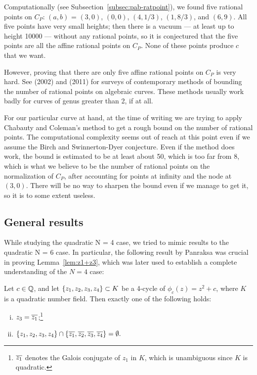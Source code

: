 Computationally (see Subsection~\ref{subsec:pab-ratpoint}), we found
five rational points on $C_P$: $(a, b)$ = $(3, 0)$, $(0, 0)$, $(4,
1/3)$, $(1, 8/3)$, and $(6, 9)$. All five points have very small
heights; then there is a vacuum --- at least up to height 10000 ---
without any rational points, so it is conjectured that the five points
are all the affine rational points on $C_P$. None of these points
produce $c$ that we want.

However, proving that there are only five affine rational points on
$C_P$ is very hard. See \cite{MR1956273} (2002) and \cite{MR2780629}
(2011) for surveys of contemporary methods of bounding the number of
rational points on algebraic curves. These methods usually work badly
for curves of genus greater than 2, if at all.

For our particular curve at hand, at the time of writing we are trying
to apply Chabauty and Coleman's method to get a rough bound on the
number of rational points. The computational complexity seems out of
reach at this point even if we assume the Birch and Swinnerton-Dyer
conjecture. Even if the method does work, the bound is estimated to be
at least about 50, which is too far from 8, which is what we believe
to be the number of rational points on the normalization of $C_P$,
after accounting for points at infinity and the node at $(3,
0)$. There will be no way to sharpen the bound even if we manage to
get it, so it is to some extent useless.

\subsection{General results}
\label{subsec:general}

While studying the quadratic N = 4 case, we tried to mimic results
to the quadratic N = 6 case. In particular, the following result by
Panraksa was crucial in proving Lemma~\ref{lem:z1+z3}, which was later
used to establish a complete understanding of the $N = 4$ case:

\begin{theorem} 
  Let $c \in \mathbb{Q}$, and let $\left\{z_1, z_2, z_3, z_4\right\} \subset K$ be a
  4-cycle of $\phi_c(z) = z^2 + c$, where $K$ is a quadratic number
  field. Then exactly one of the following holds:
  \begin{enumerate}[(i)]
  \item $z_3 = \overline{z_1}$;\footnote{%
      $\overline{z_1}$ denotes the Galois conjugate of $z_1$ in $K$, which
      is unambiguous since $K$ is quadratic.}

  \item $\{z_1, z_2, z_3, z_4\} \cap \{\overline{z_1}, \overline{z_2}, \overline{z_3},
    \overline{z_4}\} =\emptyset.$
  \end{enumerate}
\end{theorem}

